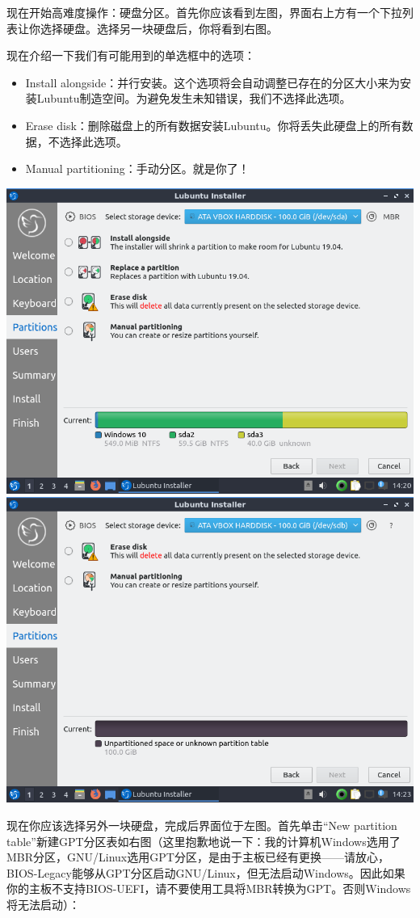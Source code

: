 现在开始高难度操作：硬盘分区。首先你应该看到左图，界面右上方有一个下拉列表让你选择硬盘。选择另一块硬盘后，你将看到右图。\par
现在介绍一下我们有可能用到的单选框中的选项：
\begin{itemize}
	\item Install alongside：并行安装。这个选项将会自动调整已存在的分区大小来为安装Lubuntu制造空间。为避免发生未知错误，我们不选择此选项。
	\item Erase disk：删除磁盘上的所有数据安装Lubuntu。你将丢失此硬盘上的所有数据，不选择此选项。
	\item Manual partitioning：手动分区。就是你了！
\end{itemize}
\begin{center}
	\includegraphics[width=0.7\linewidth]{pic/lubinst6}	\includegraphics[width=0.7\linewidth]{pic/lubinst7}
\end{center} \par
现在你应该选择另外一块硬盘，完成后界面位于左图。首先单击“New partition table”新建GPT分区表如右图（这里抱歉地说一下：我的计算机Windows选用了MBR分区，GNU/Linux选用GPT分区，是由于主板已经有更换——请放心，BIOS-Legacy能够从GPT分区启动GNU/Linux，但无法启动Windows。因此如果你的主板不支持BIOS-UEFI，请不要使用工具将MBR转换为GPT。否则Windows将无法启动）：

